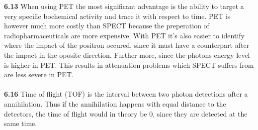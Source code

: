 \documentclass[]{article}
\begin{document}
\textbf{6.13} When using PET the most significant advantage is the ability to target a very specific bochemical activity and trace it with respect to time. PET is however much more costly than SPECT because the preperation of radiopharmaceuticals are more expensive. With PET it's also easier to identify where the impact of the positron occured, since it must have a counterpart after the impact in the oposite direction. Further more, since the photons energy level is higher in PET. This results in attenuation problems which SPECT suffers from are less severe in PET.\\\\
\textbf{6.16} Time of flight (TOF) is the interval between two photon detections after a annihilation. Thus if the annihilation happens with equal distance to the detectors, the time of flight would in theory be 0, since they are detected at the same time.
\end{document}
